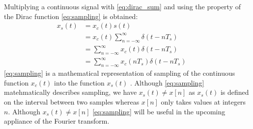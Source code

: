 Multiplying a continuous signal with \eqref{eq:dirac_sum} and using the property of the Dirac function \eqref{eq:sampling} is obtained:
\begin{align}
x_s(t)&=x_c(t)s(t)\nonumber \\
&=x_c(t)\sum_{n=-\infty}^{\infty}\delta(t - nT_s)\nonumber \\
&=\sum_{n=-\infty}^{\infty}x_c(t)\delta(t - nT_s)\nonumber\\
&=\sum_{n=-\infty}^{\infty}x_c(nT_s)\delta(t - nT_s)\phantom{mm}
\label{eq:sampling}
\end{align}
\eqref{eq:sampling} is a mathematical representation of sampling of the continuous function $x_c(t)$ into the function $x_s(t)$ \cite{DTSP}. Although \eqref{eq:sampling} matehmatically describes sampling, we have $x_s(t)\neq x[n]$ as $x_s(t)$ is defined on the interval between two samples whereas $x[n]$ only takes values at integers $n$. Although $x_s(t)\neq x[n]$ \eqref{eq:sampling} will be useful in the upcoming appliance of the Fourier transform.
